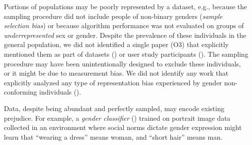 \documentclass[nonacm,sigconf,review,balance=false]{acmart}
\begin{document}
 Portions of populations may be poorly represented by a dataset, e.g., because the sampling procedure did not include people of non-binary genders (\emph{sample selection bias}) or because algorithm performance was not evaluated on groups of \emph{underrepresented} sex or gender. Despite the prevalence of these individuals in the general population, we did not identified a single paper (O3) that explicitly mentioned them as part of datasets (\dataset) or user study participants (\userstudy). The sampling procedure may have been unintentionally designed to exclude these individuals, or it might be due to measurement bias. We did not identify any work that explicitly analyzed any type of representation bias experienced by gender non-conforming individuals (\binary).

 Data, despite being abundant and perfectly sampled, may encode existing prejudice. For example, a \emph{gender classifier} (\classifier) trained on portrait image data collected in an environment where social norms dictate gender expression might learn that ``wearing a dress'' means woman, and ``short hair'' means man.
\end{document}
